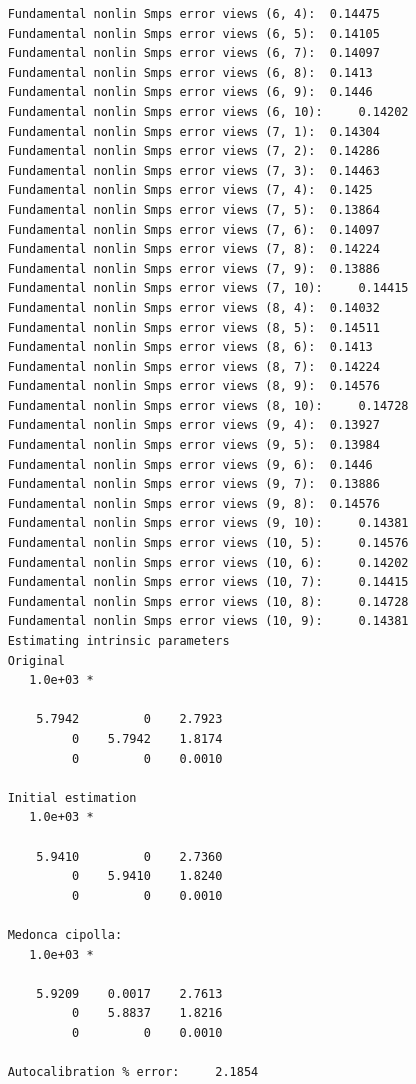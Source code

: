 \documentclass[11pt]{article}
\begin{document}
\begin{verbatim}
    Fundamental nonlin Smps error views (6, 4):	 0.14475 
    Fundamental nonlin Smps error views (6, 5):	 0.14105 
    Fundamental nonlin Smps error views (6, 7):	 0.14097 
    Fundamental nonlin Smps error views (6, 8):	 0.1413 
    Fundamental nonlin Smps error views (6, 9):	 0.1446 
    Fundamental nonlin Smps error views (6, 10):	 0.14202 
    Fundamental nonlin Smps error views (7, 1):	 0.14304 
    Fundamental nonlin Smps error views (7, 2):	 0.14286 
    Fundamental nonlin Smps error views (7, 3):	 0.14463 
    Fundamental nonlin Smps error views (7, 4):	 0.1425 
    Fundamental nonlin Smps error views (7, 5):	 0.13864 
    Fundamental nonlin Smps error views (7, 6):	 0.14097 
    Fundamental nonlin Smps error views (7, 8):	 0.14224 
    Fundamental nonlin Smps error views (7, 9):	 0.13886 
    Fundamental nonlin Smps error views (7, 10):	 0.14415 
    Fundamental nonlin Smps error views (8, 4):	 0.14032 
    Fundamental nonlin Smps error views (8, 5):	 0.14511 
    Fundamental nonlin Smps error views (8, 6):	 0.1413 
    Fundamental nonlin Smps error views (8, 7):	 0.14224 
    Fundamental nonlin Smps error views (8, 9):	 0.14576 
    Fundamental nonlin Smps error views (8, 10):	 0.14728 
    Fundamental nonlin Smps error views (9, 4):	 0.13927 
    Fundamental nonlin Smps error views (9, 5):	 0.13984 
    Fundamental nonlin Smps error views (9, 6):	 0.1446 
    Fundamental nonlin Smps error views (9, 7):	 0.13886 
    Fundamental nonlin Smps error views (9, 8):	 0.14576 
    Fundamental nonlin Smps error views (9, 10):	 0.14381 
    Fundamental nonlin Smps error views (10, 5):	 0.14576 
    Fundamental nonlin Smps error views (10, 6):	 0.14202 
    Fundamental nonlin Smps error views (10, 7):	 0.14415 
    Fundamental nonlin Smps error views (10, 8):	 0.14728 
    Fundamental nonlin Smps error views (10, 9):	 0.14381 
    Estimating intrinsic parameters
    Original
       1.0e+03 *
    
        5.7942         0    2.7923
             0    5.7942    1.8174
             0         0    0.0010
    
    Initial estimation
       1.0e+03 *
    
        5.9410         0    2.7360
             0    5.9410    1.8240
             0         0    0.0010
    
    Medonca cipolla: 
       1.0e+03 *
    
        5.9209    0.0017    2.7613
             0    5.8837    1.8216
             0         0    0.0010
    
    Autocalibration % error:	 2.1854 
    

\end{verbatim}
\end{document}
